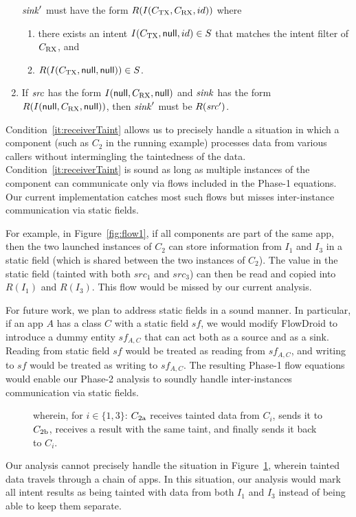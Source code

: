 \begin{sloppypar}
\begin{enumerate}
    $\mathit{sink}'$ must have the form $R(I(C_{\rm TX}, C_{\rm RX}, id))$
    where
    \begin{enumerate}
    \item
	there exists an intent $I(C_{\rm TX}, \textsf{null}, id) \in S$
	that matches the intent filter of $C_{\rm RX}$, and
    \item
	$R(I(C_{\rm TX}, \textsf{null}, \textsf{null})) \in S$.
    \end{enumerate}
\item
\label{it:receiverTaint}
    If $\mathit{src}$ has the form $I(\textsf{null}, C_{\rm RX}, \textsf{null})$ and
    $\mathit{sink}$ has the form $R(I(\textsf{null}, C_{\rm RX}, \textsf{null}))$,
    then $\mathit{sink}'$ must be $R(\mathit{src}')$.
\end{enumerate}
\end{sloppypar}

Condition~\ref{it:receiverTaint} allows us to precisely handle a situation in
which a component (such as $C_2$ in the running example) processes data from
various callers without intermingling the taintedness of the data.  
Condition~\ref{it:receiverTaint} is sound as long as multiple instances of the
component can communicate only via flows included in the Phase-1 equations.
Our current implementation catches most such flows but misses inter-instance
communication via static fields.  

For example, in Figure~\ref{fig:flow1},
if all components are part of the same app, then the two launched instances of
$C_2$ can store information from $I_1$ and $I_3$ in a static field (which is
shared between the two instances of $C_2$).  The value in the static field
(tainted with both $src_1$ and $src_3$) can then be read and copied into
$R(I_1)$ and $R(I_3)$.  This flow would be missed by our current analysis.


For future work, we plan to address static fields in a sound manner.  In
particular, if an app $A$ has a class $C$ with a static field $sf$, we would
modify FlowDroid to introduce a dummy entity $sf\!_{A , C}$ that can act both as a
source and as a sink.  Reading from static field $sf$ would be treated as
reading from $sf\!_{A,C}$, and writing to $sf$ would be treated as writing to
$sf\!_{A,C}$.  The resulting Phase-1 flow equations would enable our Phase-2
analysis to soundly handle inter-instances communication via static fields.

\begin{figure}[!bt]
\center
\scalebox{0.80}{}
\caption[Example of inter-app communication flow]{ wherein, for $i \in \{1,3\}$: $C_{\rm 2a}$ receives tainted data from $C_i$, sends it to $C_{\rm 2b}$, receives a result with the same taint, and finally sends it back to $C_i$.
}
\label{fig:flow2}
\end{figure}
Our analysis cannot precisely handle the situation in
Figure~\ref{fig:flow2}, wherein tainted data travels through a chain of apps.
In this situation, our analysis would mark all intent results as being tainted
with data from both $I_1$ and $I_3$ instead of being able to keep them separate.


